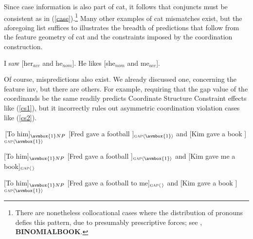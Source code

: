 \documentclass[output=paper]{langsci/langscibook}
\begin{document}
\noindent
Since case information is also part of {\sc cat}, it follows that conjuncts must be consistent as in (\ref{case}).\footnote{There are nonetheless collocational cases where the distribution of pronouns defies this pattern, due to presumably prescriptive forces; see \citet{grano}, {\bf BINOMIALBOOK}.} Many other examples of {\sc cat} mismatches exist, but the aforegoing list suffices to
illustrates the breadth of predictions that follow from the feature geometry of {\sc cat} and the constraints imposed by
the coordination construction.

\begin{exe}
\ex
\begin{xlista}
\ex{*}I saw [her$_{acc}$ and he$_{nom}$].
\ex{*}He likes [she$_{nom}$ and me$_{acc}$].
\end{xlista}\label{case}
\end{exe}




Of course, mispredictions also exist. We already discussed one, concerning the feature {\sc inv}, but there are others. For example, requiring that the {\sc gap} value of the coordinands be the same readily predicts Coordinate Structure Constraint effects like 
(\ref{cs1}), but it incorrectly rules out asymmetric coordination violation cases like (\ref{cs2}).




\begin{exe}
\ex \begin{xlista}
\ex \,[To him]$_{\avmbox{1}NP}$  [Fred gave a football \spc]$_{\textup{\sc gap} \langle \avmbox{1} \rangle}$ and
[Kim gave a book \spc]$_{\textup{\sc gap} \langle \avmbox{1} \rangle}$

\ex{*}[To him]$_{\avmbox{1}NP}$ [Fred gave a football \spc]$_{\textup{\sc gap} \langle \avmbox{1} \rangle}$ and
[Kim gave me a book]$_{\textup{\sc gap} \langle \, \rangle}$

\ex{*}[To him]$_{\avmbox{1}NP}$  [Fred gave a football to me]$_{\textup{\sc gap} \langle \, \rangle}$ and
[Kim gave a book \spc]$_{\textup{\sc gap} \langle \avmbox{1} \rangle}$
\end{xlista}\label{cs1}
\end{exe}
\end{document}
